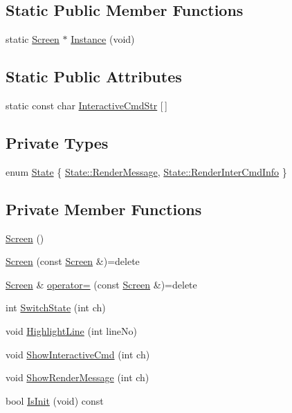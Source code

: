 \subsection*{Static Public Member Functions}
\begin{DoxyCompactItemize}
\item 
static \hyperlink{classScreen}{Screen} $\ast$ \hyperlink{classScreen_a737e0e6d802ff6c6f3055c94432fd062}{Instance} (void)
\end{DoxyCompactItemize}
\subsection*{Static Public Attributes}
\begin{DoxyCompactItemize}
\item 
static const char \hyperlink{classScreen_aeaa4372d83cf381da26b0f06be0c08f2}{Interactive\-Cmd\-Str} \mbox{[}$\,$\mbox{]}
\end{DoxyCompactItemize}
\subsection*{Private Types}
\begin{DoxyCompactItemize}
\item 
enum \hyperlink{classScreen_a3b2273cea4444624a4fb6542ee2ce44e}{State} \{ \hyperlink{classScreen_a3b2273cea4444624a4fb6542ee2ce44ea0c1142ba26a81392fece35ae71e5bb31}{State\-::\-Render\-Message}, 
\hyperlink{classScreen_a3b2273cea4444624a4fb6542ee2ce44ea08a6b92dc8c413bc10fdce91fdc730ad}{State\-::\-Render\-Inter\-Cmd\-Info}
 \}
\end{DoxyCompactItemize}
\subsection*{Private Member Functions}
\begin{DoxyCompactItemize}
\item 
\hyperlink{classScreen_ae7576476fc6e6a6eaa66389fdc41fe72}{Screen} ()
\item 
\hyperlink{classScreen_a0e756e6d8543c7efe051beb0f757ca38}{Screen} (const \hyperlink{classScreen}{Screen} \&)=delete
\item 
\hyperlink{classScreen}{Screen} \& \hyperlink{classScreen_a6e3bc79495fd0a10b19c2bb19b6d0d85}{operator=} (const \hyperlink{classScreen}{Screen} \&)=delete
\item 
int \hyperlink{classScreen_affe4f3c4fa6ed3a0ee953f1a75eee09e}{Switch\-State} (int ch)
\item 
void \hyperlink{classScreen_ac23986bc6e46e1d1565fec76da3a12fe}{Highlight\-Line} (int line\-No)
\item 
void \hyperlink{classScreen_a1957413647a5858f2c8324124c247ba2}{Show\-Interactive\-Cmd} (int ch)
\item 
void \hyperlink{classScreen_a27912037b26e33f45f0d5b7cfca777b3}{Show\-Render\-Message} (int ch)
\item 
bool \hyperlink{classScreen_a0e172a443241197f50216c532be093df}{Is\-Init} (void) const 
\end{DoxyCompactItemize}
